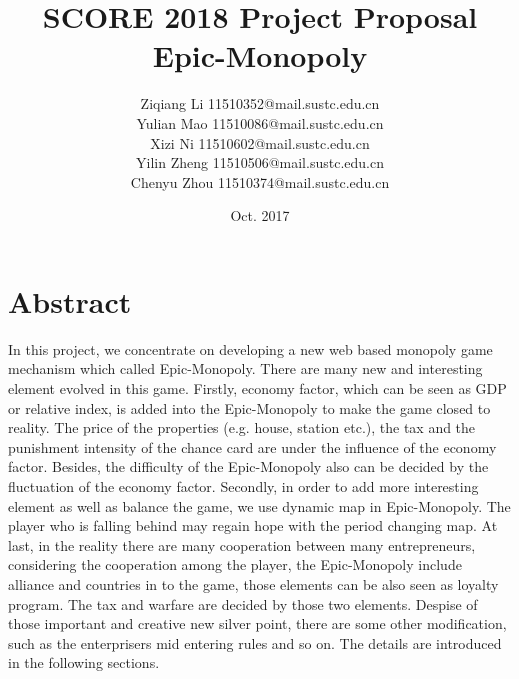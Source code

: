 \documentclass[a4paper,12pt]{article}
\begin{document}

\title{SCORE 2018 Project Proposal\\Epic-Monopoly}
\author{\small Ziqiang Li 11510352@mail.sustc.edu.cn\\
\small Yulian Mao 11510086@mail.sustc.edu.cn\\
\small Xizi Ni 11510602@mail.sustc.edu.cn\\
\small Yilin Zheng 11510506@mail.sustc.edu.cn\\
\small Chenyu Zhou 11510374@mail.sustc.edu.cn}
\date{Oct. 2017}



\maketitle


\section{Abstract}
\lettrine[lines=2,loversize=0.35,lraise=0.07,findent=3pt,nindent=2pt]{I}{}n this project, we concentrate on developing a new web based monopoly game mechanism which called Epic-Monopoly. There are many new and interesting element evolved in this game. Firstly, economy factor, which can be seen as GDP or relative index, is added into the Epic-Monopoly to make the game closed to reality. The price of the properties (e.g. house, station etc.), the tax and the punishment intensity of the chance card are under the influence of the economy factor. Besides, the difficulty of the Epic-Monopoly also can be decided by the fluctuation of the economy factor. Secondly, in order to add more interesting element as well as balance the game, we use dynamic map in Epic-Monopoly. The player who is falling behind may regain hope with the period changing map. At last, in the reality there are many cooperation between many entrepreneurs, considering the cooperation among the player, the Epic-Monopoly include alliance and countries in to the game, those elements can be also seen as loyalty program. The tax and warfare are decided by those two elements. Despise of those important and creative new silver point, there are some other modification, such as the enterprisers mid entering rules and so on. The details are introduced in the following sections.
\end{document}
